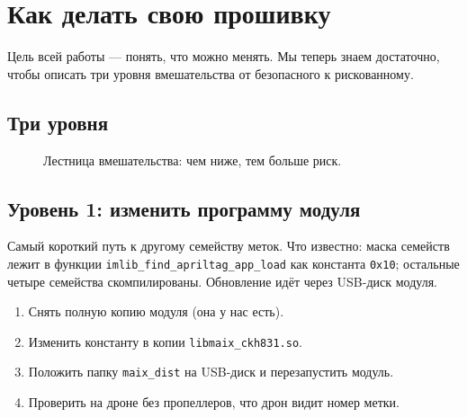 \chapter{Как делать свою прошивку}\label{ch:svoya}

Цель всей работы --- понять, что можно менять. Мы теперь знаем достаточно, чтобы описать три уровня вмешательства от безопасного к рискованному.

\section{Три уровня}

\begin{figure}[tbp]
\centering
{}
\caption{Лестница вмешательства: чем ниже, тем больше риск.}\label{fig:ladder}
\end{figure}

\section{Уровень 1: изменить программу модуля}

Самый короткий путь к другому семейству меток. Что известно: маска семейств лежит в функции \texttt{imlib\_find\_apriltag\_app\_load} как константа \texttt{0x10}; остальные четыре семейства скомпилированы. Обновление идёт через USB-диск модуля. \pr{}

\begin{enumerate}
  \item Снять полную копию модуля (она у нас есть).
  \item Изменить константу в копии \texttt{libmaix\_ckh831.so}.
  \item Положить папку \texttt{maix\_dist} на USB-диск и перезапустить модуль.
  \item Проверить на дроне без пропеллеров, что дрон видит номер метки.
\end{enumerate}

